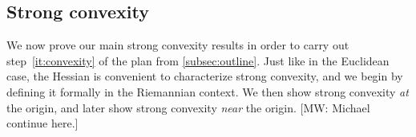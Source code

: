 \documentclass{article}
\renewcommand{\vec}{\bm}
\newcommand{\CF}[1]{{\color{purple}[CF: #1]}}
\newcommand{\MW}[1]{{\color{red}[MW: #1]}}
\begin{document}





\subsection{Strong convexity}
We now prove our main strong convexity results in order to carry out step~\ref{it:convexity} of the plan from \cref{subsec:outline}.
Just like in the Euclidean case, the Hessian is convenient to characterize strong convexity, and we begin by defining it formally in the Riemannian context.
We then show strong convexity \emph{at} the origin, and later show strong convexity \emph{near} the origin.
\MW{Michael continue here.}
\end{document}
